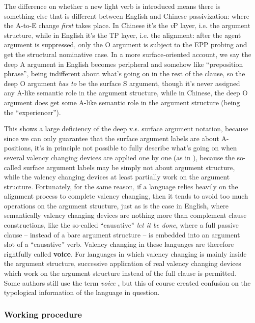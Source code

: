 \documentclass[UTF8, a4paper, oneside, scheme=plain]{ctexart}
\newcommand*{\citefig}[1]{Fig.~{#1}}
\newcommand*{\concept}[1]{\textbf{#1}}
\newcommand*{\term}[1]{\emph{#1}}
\newcommand*{\corpus}[1]{\emph{#1}}
\newcommand*{\vP}{\textit{v}P}
\begin{document}
The difference on whether a new light verb is introduced
means there is something else that is different between English and Chinese passivization:
where the A-to-E change \emph{first} takes place.
In Chinese it's the \vP{} layer, i.e. the argument structure,
while in English it's the TP layer, i.e. the alignment:
after the agent argument is suppressed,
only the O argument is subject to the EPP probing
and get the structural nominative case.
In a more surface-oriented account,
we say the deep A argument in English becomes peripheral and somehow like ``preposition phrase'',
being indifferent about what's going on in the rest of the clause,
so the deep O argument \emph{has to} be the surface S argument,
though it's never assigned any A-like semantic role in the argument structure,
while in Chinese,
the deep O argument does get some A-like semantic role in the argument structure
(being the ``experiencer'').

This shows a large deficiency of the deep v.s. surface argument notation,
because since we can only guarantee that the surface argument labels are about A-positions, 
it's in principle not possible to fully describe what's going on 
when several valency changing devices are applied one by one
(as in \citet[\citefig{11.1}]{jacques2021grammar}),
because the so-called surface argument labels may be simply not about argument structure,
while the valency changing devices at least partially work on the argument structure.
Fortunately, for the same reason, if a language relies heavily on the alignment process 
to complete valency changing,
then it tends to avoid too much operations on the argument structure,
just as is the case in English,
where semantically valency changing devices are nothing more than 
complement clause constructions,
like the so-called ``causative'' \corpus{let it be done},
where a full passive clause -- instead of a bare argument structure -- is embedded 
into an argument slot of a ``causative'' verb.
Valency changing in these languages are therefore rightfully called \concept{voice}.
For languages in which valency changing is mainly inside the argument structure,
successive application of real valency changing devices which work on the argument structure
instead of the full clause is permitted.
Some authors still use the term \term{voice} \citep{jacques2021grammar},
but this of course created confusion on the typological information of the language in question.

\subsubsection{Working procedure}
\end{document}
